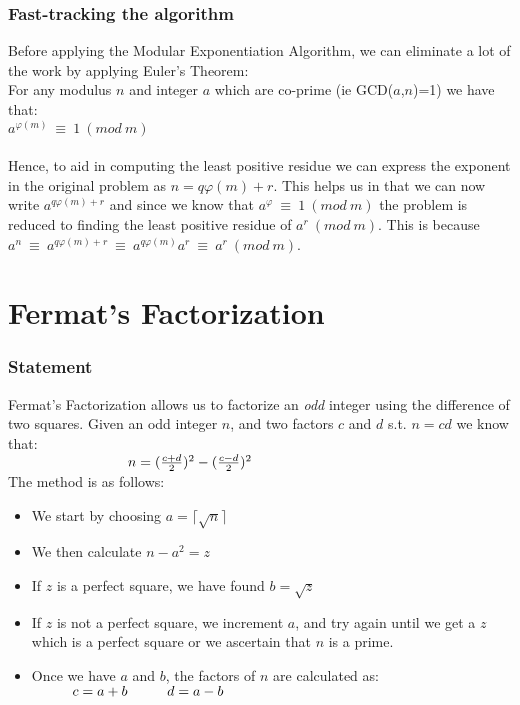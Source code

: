 \documentclass{article}
\newcommand\tab[1][3cm]{\hspace*{#1}}
\newcommand\tabOne[1][1cm]{\hspace*{#1}}
\begin{document}
	\subsubsection{Fast-tracking the algorithm}
	Before applying the Modular Exponentiation Algorithm, we can eliminate a lot of the work by applying Euler's Theorem:\\
	For any modulus $n$ and integer $a$ which are co-prime (ie GCD($a$,$n$)=1) we have that:\\
		\tabOne $a^{\varphi(m)}~\equiv~1~(mod~m)$\\
	\\
	Hence, to aid in computing the least positive residue we can express the exponent in the original problem as $n=q\varphi(m)+r$. This helps us in that we can now write $a^{q\varphi(m)+r}$ and since we know that $a^{\varphi}~\equiv~1~(mod~m)$ the problem is reduced to finding the least positive residue of $a^r~(mod~m)$. This is because $a^n~\equiv~a^{q\varphi(m)+r}~\equiv~a^{q\varphi(m)}a^r~\equiv~a^{r}~(mod~m)$.
	
\section{Fermat's Factorization}
	\subsubsection{Statement}
	Fermat's Factorization allows us to factorize an \emph{odd} integer using the difference of two squares. Given an odd integer $n$, and two factors $c$ and $d$ s.t. $n=cd$ we know that:\\
		$
			\tab	n=(\frac{c+d}{2})^2-(\frac{c-d}{2})^2\\
		$\\
	The method is as follows:
		\begin{itemize}
			\item We start by choosing $a=\lceil\sqrt{n}\rceil$
			\item We then calculate $n-a^2=z$
			\item If $z$ is a perfect square, we have found $b=\sqrt{z}$
			\item If $z$ is not a perfect square, we increment $a$, and try again until we get a $z$ which is a perfect square or we ascertain that $n$ is a prime.
			\item Once we have $a$ and $b$, the factors of $n$ are calculated as:\\
					$
						\tabOne c=a+b\\
						\tabOne d=a-b\\
					$\\
		\end{itemize}
\end{document}
